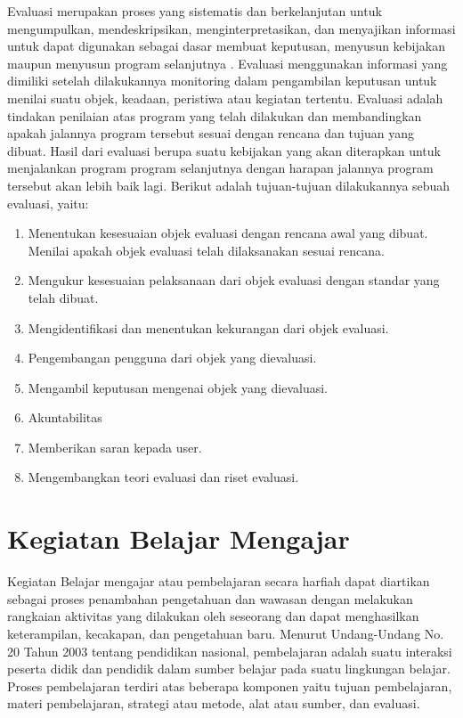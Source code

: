 	Evaluasi merupakan proses yang sistematis dan berkelanjutan untuk mengumpulkan, mendeskripsikan, menginterpretasikan, dan menyajikan informasi untuk dapat digunakan sebagai dasar membuat keputusan, menyusun kebijakan maupun menyusun program selanjutnya \citep{Widoyoko}. Evaluasi menggunakan informasi yang dimiliki setelah dilakukannya monitoring dalam pengambilan keputusan untuk menilai suatu objek, keadaan, peristiwa atau kegiatan tertentu. Evaluasi adalah tindakan penilaian atas program yang telah dilakukan dan membandingkan apakah jalannya program tersebut sesuai dengan rencana dan tujuan yang dibuat. Hasil dari evaluasi berupa suatu kebijakan yang akan diterapkan untuk menjalankan program program selanjutnya dengan harapan jalannya program tersebut akan lebih baik lagi.
	Berikut adalah tujuan-tujuan dilakukannya sebuah evaluasi, yaitu: \citep{Wirawan2011}
\begin{enumerate}
	\item Menentukan kesesuaian objek evaluasi dengan rencana awal yang dibuat. Menilai apakah objek evaluasi telah dilaksanakan sesuai rencana.
	\item Mengukur kesesuaian pelaksanaan dari objek evaluasi dengan standar yang telah dibuat.
	\item Mengidentifikasi dan menentukan kekurangan dari objek evaluasi.
	\item Pengembangan pengguna dari objek yang dievaluasi.
	\item Mengambil keputusan mengenai objek yang dievaluasi.
	\item Akuntabilitas
	\item Memberikan saran kepada user.
	\item Mengembangkan teori evaluasi dan riset evaluasi.
\end{enumerate}


\section{Kegiatan Belajar Mengajar}
	Kegiatan Belajar mengajar atau pembelajaran secara harfiah dapat diartikan sebagai proses penambahan pengetahuan dan wawasan dengan melakukan rangkaian aktivitas yang dilakukan oleh seseorang dan dapat menghasilkan keterampilan, kecakapan, dan pengetahuan baru. Menurut Undang-Undang No. 20 Tahun 2003 tentang pendidikan nasional, pembelajaran adalah suatu interaksi peserta didik dan pendidik dalam sumber belajar pada suatu lingkungan belajar. Proses pembelajaran terdiri atas beberapa komponen yaitu tujuan pembelajaran, materi pembelajaran, strategi atau metode, alat atau sumber, dan evaluasi.

